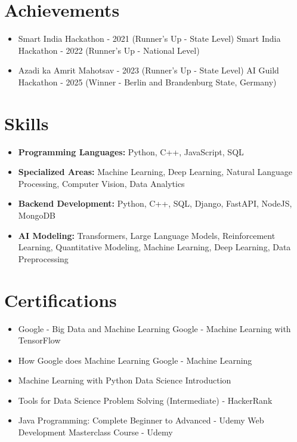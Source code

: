 \documentclass[a4paper,10pt]{article}
\begin{document}
\section*{Achievements}
\begin{itemize}
\item Smart India Hackathon - 2021 (Runner's Up - State Level) \hfill Smart India Hackathon - 2022 (Runner's Up - National Level)
\item Azadi ka Amrit Mahotsav - 2023 (Runner's Up - State Level) \hfill AI Guild Hackathon - 2025 (Winner - Berlin and Brandenburg State, Germany)
\end{itemize}

\section*{Skills}
\begin{itemize}
  \item \textbf{Programming Languages:} Python, C++, JavaScript, SQL
  \item \textbf{Specialized Areas:} Machine Learning, Deep Learning, Natural Language Processing, Computer Vision, Data Analytics
  \item \textbf{Backend Development:} Python, C++, SQL, Django, FastAPI, NodeJS, MongoDB
  \item \textbf{AI Modeling:} Transformers, Large Language Models, Reinforcement Learning, Quantitative Modeling, Machine Learning, Deep Learning, Data Preprocessing
\end{itemize}

\section*{Certifications}
\begin{itemize}
\item Google - Big Data and Machine Learning \hfill Google - Machine Learning with TensorFlow
\item How Google does Machine Learning \hfill Google - Machine Learning
\item Machine Learning with Python \hfill Data Science Introduction
\item Tools for Data Science \hfill Problem Solving (Intermediate) - HackerRank
\item Java Programming: Complete Beginner to Advanced - Udemy \hfill Web Development Masterclass Course - Udemy
\end{itemize}
\end{document}
